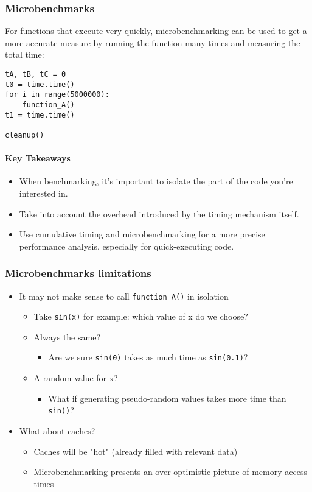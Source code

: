 \documentclass[12pt]{article}
\begin{document}
\subsubsection{Microbenchmarks}

For functions that execute very quickly, microbenchmarking can be used to get a more accurate measure by running the function many times and measuring the total time:

\begin{lstlisting}
tA, tB, tC = 0
t0 = time.time()
for i in range(5000000):
    function_A()
t1 = time.time()

cleanup()
\end{lstlisting}

\paragraph{Key Takeaways}
\begin{itemize}
    \item When benchmarking, it's important to isolate the part of the code you're interested in.
    \item Take into account the overhead introduced by the timing mechanism itself.
    \item Use cumulative timing and microbenchmarking for a more precise performance analysis, especially for quick-executing code.
\end{itemize}

\subsubsection{Microbenchmarks limitations}

\begin{itemize}
    \item It may not make sense to call \texttt{function\_A()} in isolation
    \begin{itemize}
        \item Take \texttt{sin(x)} for example: which value of x do we choose?
        \item Always the same?
        \begin{itemize}
            \item Are we sure \texttt{sin(0)} takes as much time as \texttt{sin(0.1)}?
        \end{itemize}
        \item A random value for x?
        \begin{itemize}
            \item What if generating pseudo-random values takes more time than \texttt{sin()}?
        \end{itemize}
    \end{itemize}
    \item What about caches?
    \begin{itemize}
        \item Caches will be "hot" (already filled with relevant data)
        \item Microbenchmarking presents an over-optimistic picture of memory access times
    \end{itemize}
\end{itemize}
\end{document}
